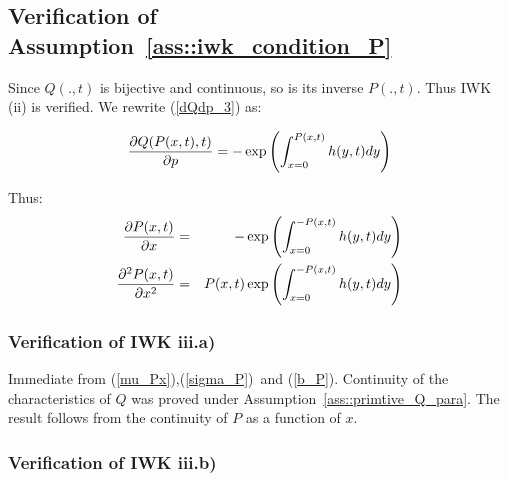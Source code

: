 \documentclass{article}
\begin{document}

\subsection{Verification of Assumption~\protect\ref{ass::iwk_condition_P}}

Since $Q(.,t)$ is bijective and continuous, so is its inverse $P(.,t)$. Thus
IWK (ii) is verified. We rewrite (\ref{dQdp_3}) as:

\begin{equation*}
\frac{\partial Q(P(x,t),t)}{\partial p}=-\exp \left( {%
\int_{x=0}^{P(x,t)}h(y,t)dy}\right)
\end{equation*}

Thus:%
\begin{eqnarray}
\frac{\partial P(x,t)}{\partial x} &=&-\exp \left( {%
\int_{x=0}^{-P(x,t)}h(y,t)dy}\right)  \label{dPdx} \\
\frac{\partial ^{2}P(x,t)}{\partial x^{2}} &=&P(x,t)\exp \left( {%
\int_{x=0}^{-P(x,t)}h(y,t)dy}\right)  \label{dPdx_square}
\end{eqnarray}

\subsubsection{Verification of IWK iii.a)}

Immediate from (\ref{mu_Px}),(\ref{sigma_P})\ and (\ref{b_P}). Continuity of
the characteristics of $Q$ was proved under Assumption~\ref{ass::primtive_Q_para}. The result follows
from the continuity of $P$ as a function of $x$.

\bigskip

\subsubsection{Verification of IWK iii.b)}
\end{document}
